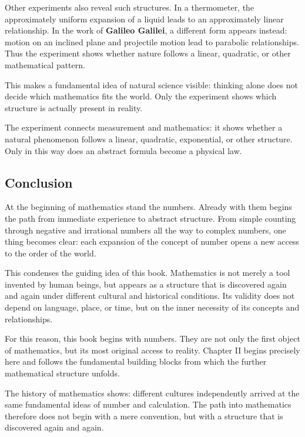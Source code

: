 Other experiments also reveal such structures.
In a thermometer, the approximately uniform expansion of a liquid
leads to an approximately linear relationship.
In the work of \textbf{Galileo Galilei}, a different form appears instead:
motion on an inclined plane and projectile motion lead to parabolic relationships.
Thus the experiment shows whether nature follows a linear,
quadratic, or other mathematical pattern.

This makes a fundamental idea of natural science visible:
thinking alone does not decide which mathematics fits the world.
Only the experiment shows
which structure is actually present in reality.

\begin{NoteBox}
	\label{box:experiment}
	\small
	The experiment connects measurement and mathematics:
	it shows whether a natural phenomenon follows a linear, quadratic,
	exponential, or other structure.
	Only in this way does an abstract formula become a physical law.
\end{NoteBox}

\subsection{Conclusion}

At the beginning of mathematics stand the numbers.
Already with them begins the path from immediate experience
to abstract structure.
From simple counting through negative and irrational numbers
all the way to complex numbers, one thing becomes clear:
each expansion of the concept of number opens a new access
to the order of the world.

This condenses the guiding idea of this book.
Mathematics is not merely a tool invented by human beings,
but appears as a structure
that is discovered again and again
under different cultural and historical conditions.
Its validity does not depend on language,
place, or time,
but on the inner necessity of its concepts and relationships.

For this reason, this book begins with numbers.
They are not only the first object of mathematics,
but its most original access to reality.
Chapter II begins precisely here
and follows the fundamental building blocks
from which the further mathematical structure unfolds.

\begin{NoteBox}
	\label{box:universal}
	\small
	The history of mathematics shows:
	different cultures independently arrived
	at the same fundamental ideas of number and calculation.
	The path into mathematics therefore does not begin with a mere convention,
	but with a structure that is discovered again and again.
\end{NoteBox}